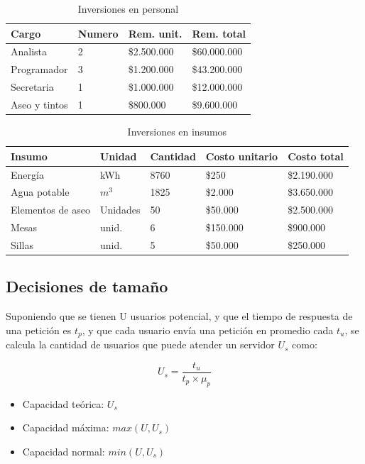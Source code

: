 \documentclass[a4paper, 12pt, oneside]{article}
\begin{document}
	\begin{table}
		\caption{Inversiones en personal}
		\begin{tabular}{ | p{3cm} | p{2cm} | p{2cm} | p{2cm} | }
		\hline
		Cargo & Numero & Rem. unit. & Rem. total \\
		\hline
		Analista & 2 & \$2.500.000 & \$60.000.000 \\
		\hline					
		Programador & 3 & \$1.200.000 & \$43.200.000 \\
		\hline
		Secretaria & 1 & \$1.000.000 & \$12.000.000 \\
		\hline
		Aseo y tintos & 1 & \$800.000 & \$9.600.000 \\
		\hline
		\end{tabular}
		\label{tb:invPersonal}
	\end{table}

	\begin{table}
		\caption{Inversiones en insumos}
		\begin{tabular}{ | p{2.5cm} | p{1.5cm} | p{1.5cm} | p{2cm} | p{2cm} | }
		\hline
		Insumo & Unidad & Cantidad & Costo unitario & Costo total \\
		\hline					
		Energía & kWh & 8760 & \$250 & \$2.190.000 \\
		\hline					
		Agua potable & $m^{3}$ & 1825 & \$2.000 & \$3.650.000 \\
		\hline
		Elementos de aseo & Unidades & 50 & \$50.000 & \$2.500.000 \\
		\hline
		Mesas & unid. & 6 & \$150.000 & \$900.000 \\
		\hline
		Sillas & unid. & 5 & \$50.000 & \$250.000 \\
		\hline
		\end{tabular}
		\label{tb:invInsumos}
	\end{table}
		
	\subsection{Decisiones de tamaño}
	Suponiendo que se tienen U usuarios potencial, y que el tiempo de respuesta de una petición es $t_p$, y que cada usuario envía una petición en promedio cada $t_u$, se calcula la cantidad de usuarios que puede atender un servidor $U_s$ como:
  
	\begin{equation}
	U_s = \frac{t_u}{t_p \times \mu_p} 
	\label{eq:capacidad}
	\end{equation}

	\begin{itemize}
	 \item Capacidad teórica: $U_s$
	 \item Capacidad máxima: $max(U, U_s)$
	 \item Capacidad normal: $min(U, U_s)$
	\end{itemize}
	
\end{document}
